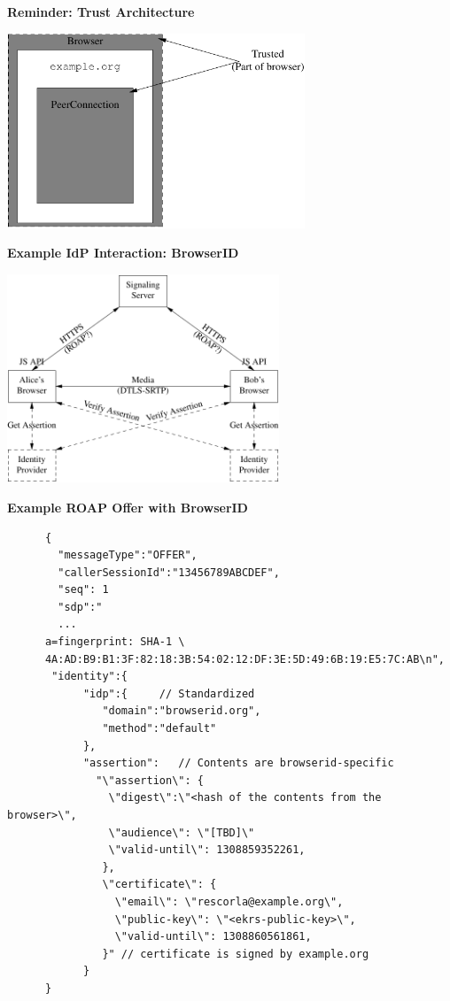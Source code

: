 \documentclass[helvetica]{seminar}
\newcommand{\heading}[1]{%
  \begin{center} 
    \large\bf 
    #1 
  \end{center} 
  \vspace{.4 in}}
\begin{document}
\begin{slide}
\heading{Reminder: Trust Architecture}

\begin{center}
\includegraphics[width=3.5in]{rtcweb-security-arch-no-idp}
\end{center}

\end{slide}




\begin{slide}
\heading{Example IdP Interaction: BrowserID}

\includegraphics[width=3.2in]{full-topology}

\end{slide}

\begin{slide}
\heading{Example ROAP Offer with BrowserID}

\begin{tiny}
\begin{verbatim}
      {
        "messageType":"OFFER",
        "callerSessionId":"13456789ABCDEF",
        "seq": 1
        "sdp":"
        ...
      a=fingerprint: SHA-1 \
      4A:AD:B9:B1:3F:82:18:3B:54:02:12:DF:3E:5D:49:6B:19:E5:7C:AB\n",
       "identity":{
            "idp":{     // Standardized
               "domain":"browserid.org",
               "method":"default"
            },
            "assertion":   // Contents are browserid-specific
              "\"assertion\": {
                \"digest\":\"<hash of the contents from the browser>\",
                \"audience\": \"[TBD]\"
                \"valid-until\": 1308859352261,
               },
               \"certificate\": {
                 \"email\": \"rescorla@example.org\",
                 \"public-key\": \"<ekrs-public-key>\",
                 \"valid-until\": 1308860561861,
               }" // certificate is signed by example.org
            }
      }
\end{verbatim}
\end{tiny}
\end{slide}
\end{document}

